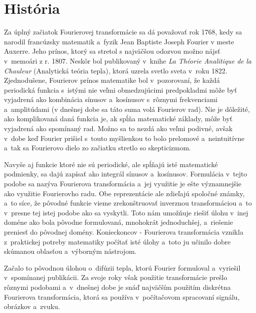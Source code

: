 \section{História}
Za úplný začiatok Fourierovej transformácie sa dá považovať rok 1768,
kedy sa narodil francúzsky matematik a~fyzik Jean Baptiste Joseph
Fourier v meste Auxerre. Jeho prínos, ktorý sa stretol s najväčšou
odozvou možno nájsť v~memoári z r. 1807. Neskôr bol publikovaný 
v~knihe \emph{La Théorie Analitique de la Chauleur} (Analytická teória
tepla), ktorá uzrela svetlo sveta v~roku 1822.
Zjednodušene, Fourierov prínos matematike bol v~pozorovaní, že každá
periodická funkcia s~istými nie veľmi obmedzujúcimi predpokladmi
môže byť vyjadrená ako kombinácia sínusov a~kosínusov s~rôznymi
frekvenciami a~amplitúdami (v dnešnej dobe sa táto suma volá Fourierov
rad). Nie je dôležité, ako komplikovaná daná funkcia je, ak spĺňa
matematické základy, môže byť vyjadrená ako spomínaný rad. Možno sa to
nezdá ako veľmi podivné, avšak v~dobe keď Fourier prišiel s~touto
myšlienkou to bolo prelomové a~neintuitívne a~tak sa Fourierovo dielo
zo začiatku stretlo so skepticizmom.

Navyše aj funkcie ktoré nie sú periodické, ale spĺňajú isté
matematické podmienky, sa dajú zapísať ako integrál sínusov a~kosínusov.
Formulácia v~tejto podobe sa nazýva Fourierova transformácia a~jej
využitie je ešte významnejšie ako využitie Fourierovho radu. Obe
reprezentácie ale zdieľajú spoločné známky, a~to síce, že pôvodné
funkcie vieme zrekonštruovať inverznou transformáciou a~to v~presne
tej istej podobe ako sa vyskytli. Toto nám umožňuje riešiť úlohu 
v~inej doméne ako bola pôvodne formulovaná, mnohokrát jednoduchšej, 
a~riešenie preniesť do pôvodnej domény. Konieckoncov - Fourierova
transformácia vznikla z~praktickej potreby matematiky počítať isté
úlohy a~toto ju učinilo dobre skúmanou oblasťou a~výborným nástrojom.

Začalo to pôvodnou úlohou o~difúzii tepla, ktorú Fourier formuloval 
a~vyriešil v~spomínanej publikácii. Za svoje roky však použitie
transformácie prešlo rôznymi podobami a~v~dnešnej dobe je snáď
najväčším použitím diskrétna Fourierova transformácia, ktorá sa
používa v~počítačovom spracovaní signálu, obrázkov a~zvuku.
